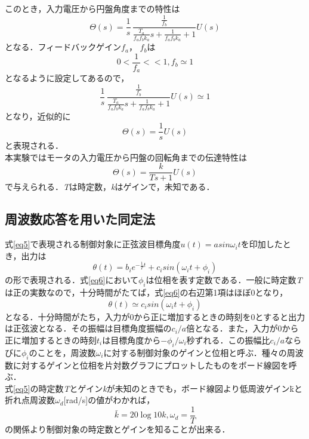 \documentclass{jsarticle}
\begin{document}
このとき，入力電圧から円盤角度までの特性は
\begin{equation} 
 \Theta(s) = \frac{1}{s}\,\frac{\frac{1}{f_b}}{\frac{T_a}{f_a f_b k_a}s + \frac{1}{f_a f_b k_a} + 1}U(s)
\end{equation}
となる．フィードバックゲイン$f_a$， $f_b$は
\begin{equation}
 0 < \frac{1}{f_a} << 1, f_b \simeq 1
\end{equation}
となるように設定してあるので，
\begin{equation}
 \frac{1}{s}\,\frac{\frac{1}{f_b}}{\frac{T_a}{f_a f_b k_a}s + \frac{1}{f_a f_b k_a} + 1}U(s) \simeq 1
  \label{eq3}
\end{equation}
となり，近似的に
\begin{equation}
 \Theta(s) = \frac{1}{s}U(s)
\end{equation}
と表現される．
\\本実験ではモータの入力電圧から円盤の回転角までの伝達特性は
\begin{equation}
 \label{eq5}
  \Theta(s) = \frac{k}{Ts + 1}U(s)
\end{equation}
で与えられる．{\it T}は時定数，{\it k}はゲインで，未知である．

   \subsection{周波数応答を用いた同定法}
   式\ref{eq5}で表現される制御対象に正弦波目標角度$u(t) = asin\omega_i t$を印加したとき，出力は
   \begin{equation}
    \label{eq6}
     \theta(t) = b_i e^{-\frac{1}{T}t} + c_i sin(\omega_i t + \phi_i)
   \end{equation}
   の形で表現される．式\ref{eq6}において$\phi_i$は位相を表す定数である．一般に時定数{\it T}は正の実数なので，十分時間がたてば，式\ref{eq6}の右辺第1項はほぼ0となり，
   \begin{equation}
    \theta(t) \simeq c_i sin(\omega_i t + \phi_i)
   \end{equation}
   となる．十分時間がたち，入力が0から正に増加するときの時刻を0とすると出力は正弦波となる．その振幅は目標角度振幅の$c_i / a$倍となる．また，入力が0から正に増加するときの時刻$t_i$は目標角度から$- \phi_i / \omega_i$秒ずれる．この振幅比$c_i / a$ならびに$\phi_i$のことを，周波数$\omega_i$に対する制御対象のゲインと位相と呼ぶ．種々の周波数に対するゲインと位相を片対数グラフにプロットしたものをボード線図を呼ぶ．\\
   式\ref{eq5}の時定数{\it T}とゲイン{\it k}が未知のときでも，ボード線図より低周波ゲイン\=kと折れ点周波数$\omega_d$[rad/s]の値がわかれば，
\begin{equation}
 \bar{k} = 20\log{10} k, \omega_d = \frac{1}{T}
  \label{eq8}
\end{equation}
の関係より制御対象の時定数とゲインを知ることが出来る．
\end{document}
